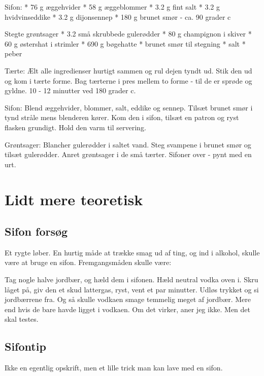 \documentclass[
  letterpaper,
  DIV=11,
  numbers=noendperiod]{scrreprt}
\begin{document}
Sifon: * 76 g æggehvider * 58 g æggeblommer * 3.2 g fint salt * 3.2 g
hvidvinseddike * 3.2 g dijonsennep * 180 g brunet smør - ca. 90 grader c

Stegte grøntsager * 3.2 små skrubbede gulerødder * 80 g champignon i
skiver * 60 g østershat i strimler * 690 g bøgehatte * brunet smør til
stegning * salt * peber

Tærte: Ælt alle ingredienser hurtigt sammen og rul dejen tyndt ud. Stik
den ud og kom i tærte forme. Bag tærterne i pres mellem to forme - til
de er sprøde og gyldne. 10 - 12 minutter ved 180 grader c.

Sifon: Blend æggehvider, blommer, salt, eddike og sennep. Tilsæt brunet
smør i tynd stråle mens blenderen kører. Kom den i sifon, tilsæt en
patron og ryst flasken grundigt. Hold den varm til servering.

Grøntsager: Blancher gulerødder i saltet vand. Steg svampene i brunet
smør og tilsæt gulerødder. Anret grøntsager i de små tærter. Sifoner
over - pynt med en urt.


\hypertarget{lidt-mere-teoretisk}{%
\chapter{Lidt mere teoretisk}\label{lidt-mere-teoretisk}}

\hypertarget{sifon-forsuxf8g}{%
\section{Sifon forsøg}\label{sifon-forsuxf8g}}

Et rygte løber. En hurtig måde at trække smag ud af ting, og ind i
alkohol, skulle være at bruge en sifon. Fremgangsmåden skulle være:

Tag nogle halve jordbær, og hæld dem i sifonen. Hæld neutral vodka oven
i. Skru låget på, giv den et skud lattergas, ryst, vent et par minutter.
Udløs trykket og si jordbærrene fra. Og så skulle vodkaen smage temmelig
meget af jordbær. Mere end hvis de bare havde ligget i vodkaen. Om det
virker, aner jeg ikke. Men det skal testes.

\hypertarget{sifontip}{%
\section{Sifontip}\label{sifontip}}

Ikke en egentlig opskrift, men et lille trick man kan lave med en sifon.
\end{document}
